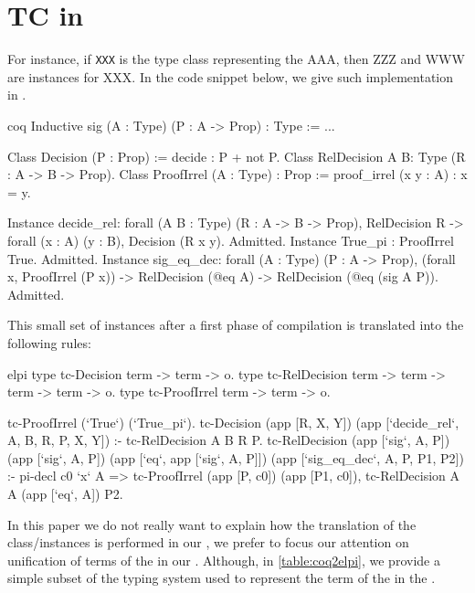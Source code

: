\documentclass{rapport}
\begin{document}
\section{TC in \coq}
For instance, if
\texttt{XXX} is the type class representing the AAA, then ZZZ and WWW are
instances for XXX. In the code snippet below, we give such implementation in
\coq. 

\begin{mintedTcolorbox}[escapeinside=&&]{coq}
  Inductive sig (A : Type) (P : A -> Prop) : Type := ...

  Class Decision (P : Prop) := decide : {P} + {not P}.
  Class RelDecision {A B: Type} (R : A -> B -> Prop).
  Class ProofIrrel (A : Type) : Prop := proof_irrel (x y : A) : x = y.

  Instance decide_rel: forall (A B : Type) (R : A -> B -> Prop),
    RelDecision R -> forall (x : A) (y : B), Decision (R x y). Admitted.
  Instance True_pi : ProofIrrel True. Admitted.
  Instance sig_eq_dec: forall (A : Type) (P : A -> Prop),
    (forall x, ProofIrrel (P x)) -> RelDecision (@eq A) ->
    RelDecision (@eq (sig A P)). Admitted.
\end{mintedTcolorbox}

This small set of instances after a first phase of compilation is translated into the following \elpi rules:

\begin{mintedTcolorbox}{elpi}
  type tc-Decision term -> term -> o.
  type tc-RelDecision term -> term -> term -> term -> o.
  type tc-ProofIrrel term -> term -> o.

  tc-ProofIrrel (`True`) (`True_pi`).
  tc-Decision (app [R, X, Y]) 
    (app [`decide_rel`, A, B, R, P, X, Y]) :-
    tc-RelDecision A B R P.
  tc-RelDecision (app [`sig`, A, P]) 
    (app [`sig`, A, P]) 
    (app [`eq`, app [`sig`, A, P]]) 
    (app [`sig_eq_dec`, A, P, P1, P2]) :-
    pi-decl c0 `x` A =>
      tc-ProofIrrel (app [P, c0]) (app [P1, c0]), 
    tc-RelDecision A A (app [`eq`, A]) P2.
\end{mintedTcolorbox}

In this paper we do not really want to explain how the translation of the
class/instances is performed in our \ml, we prefer to focus our attention on
unification of terms of the \ol in our \ml. Although, in \cref{table:coq2elpi},
we provide a simple subset of the typing system used to represent the term of
the \ol in the \ml.
\end{document}
